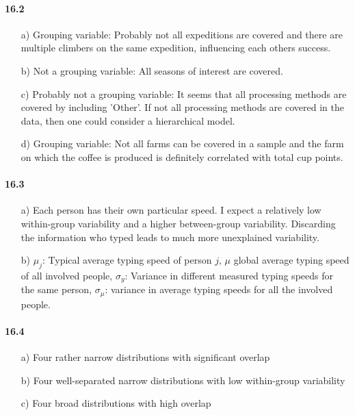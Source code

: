 \documentclass[fontsize=11pt,DIV=18,parskip=half]{scrartcl}
\begin{document}
\paragraph{16.2}
\begin{itemize}
\item[a)] Grouping variable: Probably not all expeditions are covered and there are multiple climbers on the same expedition, influencing each others success.
\item[b)] Not a grouping variable: All seasons of interest are covered.
\item[c)] Probably not a grouping variable: It seems that all processing methods are covered by including 'Other'. If not all processing methods are covered in the data, then one could consider a hierarchical model.
\item[d)] Grouping variable: Not all farms can be covered in a sample and the farm on which the coffee is produced is definitely correlated with total cup points.
\end{itemize}

\paragraph{16.3}
\begin{itemize}
\item[a)] Each person has their own particular speed. I expect a relatively low within-group variability and a higher between-group variability. Discarding the information who typed leads to much more unexplained variability.
\item[b)] $\mu_j$: Typical average typing speed of person $j$, $\mu$ global average typing speed of all involved people, $\sigma_y$: Variance in different measured typing speeds for the same person, $\sigma_\mu$: variance in average typing speeds for all the involved people.
\end{itemize}

\paragraph{16.4}
\begin{itemize}
\item[a)] Four rather narrow distributions with significant overlap
\item[b)] Four well-separated narrow distributions with low within-group variability
\item[c)] Four broad distributions with high overlap
\end{itemize}
\end{document}
